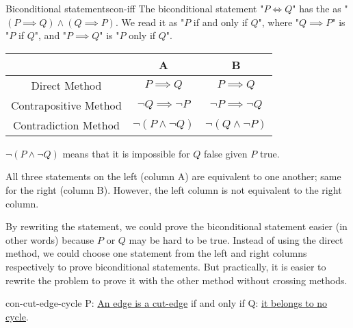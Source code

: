 \documentclass[../src/handouts/main.tex]{subfiles}
\begin{document}
\begin{remark}{Biconditional statements}{con-iff}
  The biconditional statement "$P \iff Q$" has the as "$(P \implies Q) \land (Q \implies P)$. We read it as "$P$ if and only if $Q$", where "$Q \implies P$" is "$P$ if $Q$", and "$P \implies Q$" is "$P$ only if $Q$".

  \begin{center}
    \begin{tabular}{ccc}
      \hline
                            & A                        & B                        \\ \hline
      Direct Method         & $P \implies Q$           & $P \implies Q$           \\
      Contrapositive Method & $\neg Q \implies \neg P$ & $\neg P \implies \neg Q$ \\
      Contradiction Method  & $\neg (P \land \neg Q)$  & $\neg (Q \land \neg P)$  \\
      \hline
    \end{tabular}
  \end{center}

  $\neg (P \land \neg Q)$ means that it is impossible for $Q$ false given $P$ true.

  All three statements on the left (column A) are equivalent to one another; same for the right (column B). However, the left column is not equivalent to the right column.

  By rewriting the statement, we could prove the biconditional statement easier (in other words) because $P$ or $Q$ may be hard to be true.
  Instead of using the direct method, we could choose one statement from the left and right columns respectively to prove biconditional statements.
  But practically, it is easier to rewrite the problem to prove it with the other method without crossing methods.
\end{remark}

\begin{theorem}{}{con-cut-edge-cycle}
  P: \underline{An edge is a cut-edge} if and only if Q: \underline{it belongs to no cycle}.
\end{theorem}
\end{document}
